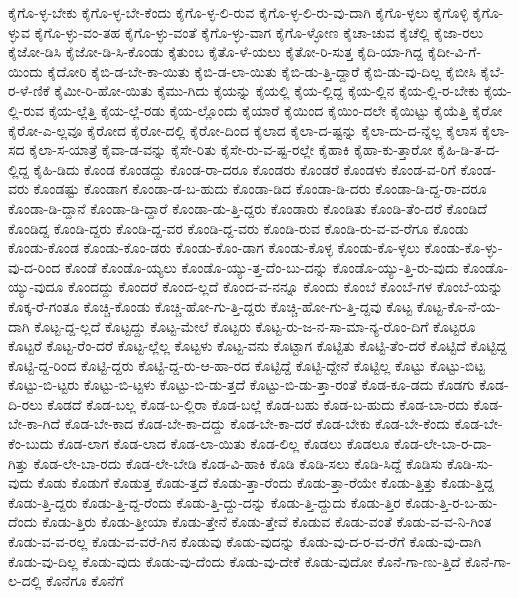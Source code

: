 {ಕೈಗೊ-ಳ್ಳ-ಬೇಕು
ಕೈಗೊ-ಳ್ಳ-ಬೇ-ಕೆಂದು
ಕೈಗೊ-ಳ್ಳ-ಲಿ-ರುವ
ಕೈಗೊ-ಳ್ಳ-ಲಿ-ರು-ವು-ದಾಗಿ
ಕೈಗೊ-ಳ್ಳಲು
ಕೈಗೊಳ್ಳಿ
ಕೈಗೊ-ಳ್ಳುವ
ಕೈಗೊ-ಳ್ಳು-ವಂ-ತಹ
ಕೈಗೊ-ಳ್ಳು-ವಂತೆ
ಕೈಗೊ-ಳ್ಳು-ವಾಗ
ಕೈಗೊ-ಳ್ಳೋಣ
ಕೈಚಾ-ಚುವ
ಕೈಚೆಲ್ಲಿ
ಕೈಜಾ-ರಲು
ಕೈಜೋ-ಡಿಸಿ
ಕೈಜೋ-ಡಿ-ಸಿ-ಕೊಂಡು
ಕೈತುಂಬ
ಕೈತೊ-ಳೆ-ಯಲು
ಕೈತೋ-ರಿ-ಸುತ್ತ
ಕೈದಿ-ಯಾ-ಗಿದ್ದ
ಕೈದೀ-ವಿ-ಗೆ-ಯಿಂದು
ಕೈದೋರಿ
ಕೈಬಿ-ಡ-ಬೇ-ಕಾ-ಯಿತು
ಕೈಬಿ-ಡ-ಲಾ-ಯಿತು
ಕೈಬಿ-ಡು-ತ್ತಿ-ದ್ದಾರೆ
ಕೈಬಿ-ಡು-ವು-ದಿಲ್ಲ
ಕೈಬೀಸಿ
ಕೈಬೆ-ರ-ಳೆ-ಣಿಕೆ
ಕೈಮೀ-ರಿ-ಹೋ-ಯಿತು
ಕೈಮು-ಗಿದು
ಕೈಯನ್ನು
ಕೈಯಲ್ಲಿ
ಕೈಯ-ಲ್ಲಿದ್ದ
ಕೈಯ-ಲ್ಲಿನ
ಕೈಯ-ಲ್ಲಿ-ರ-ಬೇಕು
ಕೈಯ-ಲ್ಲಿ-ರುವ
ಕೈಯ-ಲ್ಲೆತ್ತಿ
ಕೈಯ-ಲ್ಲೆ-ರಡು
ಕೈಯ-ಲ್ಲೊಂದು
ಕೈಯಾರೆ
ಕೈಯಿಂದ
ಕೈಯಿಂ-ದಲೇ
ಕೈಯಿಟ್ಟು
ಕೈಯೆತ್ತಿ
ಕೈರೋ
ಕೈರೋ-ಎ-ಲ್ಲವೂ
ಕೈರೋದ
ಕೈರೋ-ದಲ್ಲಿ
ಕೈರೋ-ದಿಂದ
ಕೈಲಾದ
ಕೈಲಾ-ದ-ಷ್ಟನ್ನು
ಕೈಲಾ-ದು-ದ-ನ್ನೆಲ್ಲ
ಕೈಲಾಸ
ಕೈಲಾ-ಸದ
ಕೈಲಾ-ಸ-ಯಾತ್ರೆ
ಕೈವಾ-ಡ-ವನ್ನು
ಕೈಸೇ-ರಿತು
ಕೈಸೇ-ರು-ವ-ಷ್ಟ-ರಲ್ಲೇ
ಕೈಹಾಕಿ
ಕೈಹಾ-ಕು-ತ್ತಾರೋ
ಕೈಹಿ-ಡಿ-ತ-ದ-ಲ್ಲಿದ್ದ
ಕೈಹಿ-ಡಿದು
ಕೊಂಡ
ಕೊಂಡದ್ದು
ಕೊಂಡ-ರಾ-ದರೂ
ಕೊಂಡರು
ಕೊಂಡರೆ
ಕೊಂಡಳು
ಕೊಂಡ-ವ-ರಿಗೆ
ಕೊಂಡ-ವರು
ಕೊಂಡಷ್ಟು
ಕೊಂಡಾಗ
ಕೊಂಡಾ-ಡ-ಬ-ಹುದು
ಕೊಂಡಾ-ಡಿದ
ಕೊಂಡಾ-ಡಿ-ದರು
ಕೊಂಡಾ-ಡಿ-ದ್ದ-ರಾ-ದರೂ
ಕೊಂಡಾ-ಡಿ-ದ್ದಾನೆ
ಕೊಂಡಾ-ಡಿ-ದ್ದಾರೆ
ಕೊಂಡಾ-ಡು-ತ್ತಿ-ದ್ದರು
ಕೊಂಡಾರು
ಕೊಂಡಿತು
ಕೊಂಡಿ-ತೆಂ-ದರೆ
ಕೊಂಡಿದೆ
ಕೊಂಡಿದ್ದ
ಕೊಂಡಿ-ದ್ದರು
ಕೊಂಡಿ-ದ್ದ-ವರ
ಕೊಂಡಿ-ದ್ದ-ವರು
ಕೊಂಡಿ-ರುವ
ಕೊಂಡಿ-ರು-ವ-ವ-ರೆಗೂ
ಕೊಂಡು
ಕೊಂಡು-ಕೊಂಡ
ಕೊಂಡು-ಕೊಂ-ಡರು
ಕೊಂಡು-ಕೊಂ-ಡಾಗ
ಕೊಂಡು-ಕೊಳ್ಳ
ಕೊಂಡು-ಕೊ-ಳ್ಳಲು
ಕೊಂಡು-ಕೊ-ಳ್ಳು-ವು-ದ-ರಿಂದ
ಕೊಂಡೆ
ಕೊಂಡೊ-ಯ್ಯಲು
ಕೊಂಡೊ-ಯ್ಯು-ತ್ತ-ದೆಂ-ಬು-ದನ್ನು
ಕೊಂಡೊ-ಯ್ಯು-ತ್ತಿ-ರು-ವುದು
ಕೊಂಡೊ-ಯ್ಯು-ವುದೂ
ಕೊಂದದ್ದು
ಕೊಂದರೆ
ಕೊಂದ-ಲ್ಲದೆ
ಕೊಂದ-ವ-ನನ್ನೂ
ಕೊಂದು
ಕೊಂಬೆ
ಕೊಂಬೆ-ಗಳ
ಕೊಂಬೆ-ಯನ್ನು
ಕೊಕ್ಕ-ರೆ-ಗಂತೂ
ಕೊಚ್ಚಿ-ಕೊಂಡು
ಕೊಚ್ಚಿ-ಹೋ-ಗು-ತ್ತಿ-ದ್ದರು
ಕೊಚ್ಚಿ-ಹೋ-ಗು-ತ್ತಿ-ದ್ದವು
ಕೊಟ್ಟ
ಕೊಟ್ಟ-ಕೊ-ನೆ-ಯ-ದಾಗಿ
ಕೊಟ್ಟ-ದ್ದ-ಲ್ಲದೆ
ಕೊಟ್ಟದ್ದು
ಕೊಟ್ಟ-ಮೇಲೆ
ಕೊಟ್ಟರು
ಕೊಟ್ಟ-ರು-ಜ-ನ-ಸಾ-ಮಾ-ನ್ಯ-ರೊಂ-ದಿಗೆ
ಕೊಟ್ಟರೂ
ಕೊಟ್ಟರೆ
ಕೊಟ್ಟ-ರೆಂ-ದರೆ
ಕೊಟ್ಟ-ಲ್ಲೆಲ್ಲ
ಕೊಟ್ಟಳು
ಕೊಟ್ಟ-ವನು
ಕೊಟ್ಟಾಗ
ಕೊಟ್ಟಿತು
ಕೊಟ್ಟಿ-ತೆಂ-ದರೆ
ಕೊಟ್ಟಿದೆ
ಕೊಟ್ಟಿದ್ದ
ಕೊಟ್ಟಿ-ದ್ದ-ರಿಂದ
ಕೊಟ್ಟಿ-ದ್ದರು
ಕೊಟ್ಟಿ-ದ್ದ-ರು-ಆ-ಹಾ-ರದ
ಕೊಟ್ಟಿದ್ದೆ
ಕೊಟ್ಟಿ-ದ್ದೇನೆ
ಕೊಟ್ಟಿಲ್ಲ
ಕೊಟ್ಟು
ಕೊಟ್ಟು-ಬಿಟ್ಟ
ಕೊಟ್ಟು-ಬಿ-ಟ್ಟರು
ಕೊಟ್ಟು-ಬಿ-ಟ್ಟಳು
ಕೊಟ್ಟು-ಬಿ-ಡು-ತ್ತದೆ
ಕೊಟ್ಟು-ಬಿ-ಡು-ತ್ತಾ-ರಂತೆ
ಕೊಡ-ಕೂ-ಡದು
ಕೊಡಗು
ಕೊಡ-ದಿ-ರಲು
ಕೊಡದೆ
ಕೊಡ-ಬಲ್ಲ
ಕೊಡ-ಬ-ಲ್ಲಿರಾ
ಕೊಡ-ಬಲ್ಲೆ
ಕೊಡ-ಬಹು
ಕೊಡ-ಬ-ಹುದು
ಕೊಡ-ಬಾ-ರದು
ಕೊಡ-ಬೇ-ಕಾ-ಗಿದೆ
ಕೊಡ-ಬೇ-ಕಾದ
ಕೊಡ-ಬೇ-ಕಾ-ದದ್ದು
ಕೊಡ-ಬೇ-ಕಾ-ದರೆ
ಕೊಡ-ಬೇಕು
ಕೊಡ-ಬೇ-ಕೆಂದು
ಕೊಡ-ಬೇ-ಕೆಂ-ಬುದು
ಕೊಡ-ಲಾಗ
ಕೊಡ-ಲಾದ
ಕೊಡ-ಲಾ-ಯಿತು
ಕೊಡ-ಲಿಲ್ಲ
ಕೊಡಲು
ಕೊಡಲೂ
ಕೊಡ-ಲೇ-ಬಾ-ರ-ದಾ-ಗಿತ್ತು
ಕೊಡ-ಲೇ-ಬಾ-ರದು
ಕೊಡ-ಲೇ-ಬೇಡಿ
ಕೊಡ-ವಿ-ಹಾಕಿ
ಕೊಡಿ
ಕೊಡಿ-ಸಲು
ಕೊಡಿ-ಸಿದ್ದೆ
ಕೊಡಿಸು
ಕೊಡಿ-ಸು-ವುದು
ಕೊಡು
ಕೊಡುಗೆ
ಕೊಡುತ್ತ
ಕೊಡು-ತ್ತದೆ
ಕೊಡು-ತ್ತಾ-ರೆಂದು
ಕೊಡು-ತ್ತಾ-ರೆಯೇ
ಕೊಡು-ತ್ತಿತ್ತು
ಕೊಡು-ತ್ತಿದ್ದ
ಕೊಡು-ತ್ತಿ-ದ್ದರು
ಕೊಡು-ತ್ತಿ-ದ್ದ-ರೆಂದು
ಕೊಡು-ತ್ತಿ-ದ್ದು-ದನ್ನು
ಕೊಡು-ತ್ತಿ-ದ್ದುದು
ಕೊಡು-ತ್ತಿರ
ಕೊಡು-ತ್ತಿ-ರ-ಬ-ಹು-ದೆಂದು
ಕೊಡು-ತ್ತಿರು
ಕೊಡು-ತ್ತೀಯಾ
ಕೊಡು-ತ್ತೇನೆ
ಕೊಡು-ತ್ತೇವೆ
ಕೊಡುವ
ಕೊಡು-ವಂತೆ
ಕೊಡು-ವ-ವ-ನಿ-ಗಿಂತ
ಕೊಡು-ವ-ವ-ರಲ್ಲ
ಕೊಡು-ವ-ವರೆ-ಗಿನ
ಕೊಡುವು
ಕೊಡು-ವುದನ್ನು
ಕೊಡು-ವು-ದ-ರ-ವ-ರೆಗೆ
ಕೊಡು-ವು-ದಾಗಿ
ಕೊಡು-ವು-ದಿಲ್ಲ
ಕೊಡು-ವುದು
ಕೊಡು-ವು-ದೆಂದು
ಕೊಡು-ವು-ದೇಕೆ
ಕೊಡು-ವುದೋ
ಕೊನೆ-ಗಾ-ಣು-ತ್ತಿದೆ
ಕೊನೆ-ಗಾ-ಲ-ದಲ್ಲಿ
ಕೊನೆಗೂ
ಕೊನೆಗೆ
}
